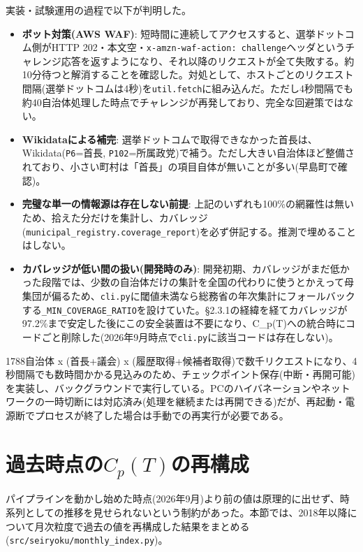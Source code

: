 \documentclass[a4paper,11pt]{ltjsarticle}
\begin{document}
実装・試験運用の過程で以下が判明した。

\begin{itemize}
  \item \textbf{ボット対策(AWS WAF)}: 短時間に連続してアクセスすると、選挙ドットコム側がHTTP 202・本文空・\texttt{x-amzn-waf-action: challenge}ヘッダというチャレンジ応答を返すようになり、それ以降のリクエストが全て失敗する。約10分待つと解消することを確認した。対処として、ホストごとのリクエスト間隔(選挙ドットコムは4秒)を\texttt{util.fetch}に組み込んだ。ただし4秒間隔でも約40自治体処理した時点でチャレンジが再発しており、完全な回避策ではない。
  \item \textbf{Wikidataによる補完}: 選挙ドットコムで取得できなかった首長は、Wikidata(\texttt{P6}=首長, \texttt{P102}=所属政党)で補う。ただし大きい自治体ほど整備されており、小さい町村は「首長」の項目自体が無いことが多い(早島町で確認)。
  \item \textbf{完璧な単一の情報源は存在しない前提}: 上記のいずれも100\%の網羅性は無いため、拾えた分だけを集計し、カバレッジ(\texttt{municipal\_registry.coverage\_report})を必ず併記する。推測で埋めることはしない。
  \item \textbf{カバレッジが低い間の扱い(開発時のみ)}: 開発初期、カバレッジがまだ低かった段階では、少数の自治体だけの集計を全国の代わりに使うとかえって母集団が偏るため、\texttt{cli.py}に閾値未満なら総務省の年次集計にフォールバックする\texttt{\_MIN\_COVERAGE\_RATIO}を設けていた。\S2.3.1の経緯を経てカバレッジが97.2\%まで安定した後にこの安全装置は不要になり、C\_p(T)への統合時にコードごと削除した(2026年9月時点で\texttt{cli.py}に該当コードは存在しない)。
\end{itemize}

1788自治体 x (首長+議会) x (履歴取得+候補者取得)で数千リクエストになり、4秒間隔でも数時間かかる見込みのため、チェックポイント保存(中断・再開可能)を実装し、バックグラウンドで実行している。PCのハイバネーションやネットワークの一時切断には対応済み(処理を継続または再開できる)だが、再起動・電源断でプロセスが終了した場合は手動での再実行が必要である。

\section{過去時点の$C_p(T)$の再構成}
\label{sec:historical}

パイプラインを動かし始めた時点(2026年9月)より前の値は原理的に出せず、時系列としての推移を見せられないという制約があった。本節では、2018年以降について月次粒度で過去の値を再構成した結果をまとめる(\texttt{src/seiryoku/monthly\_index.py})。
\end{document}
